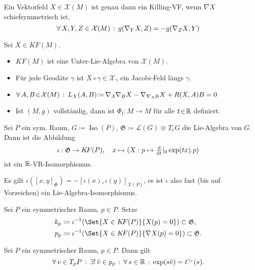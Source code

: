 \documentclass{cheat-sheet}
\DeclareMathOperator{\Iso}{Iso} %
\newcommand{\Gie}{\mathfrak{G}} %
\newcommand{\KF}{K\!F} %
\newcommand{\VF}{\mathcal{X}} %
\begin{document}
\begin{lem}
  Ein Vektorfeld $X \in \VF(M)$ ist genau dann ein Killing-VF, wenn $\nabla X$ schiefsymmetrisch ist, \dh{}
  \[ \fa{X, Y, Z \in \VF(M)} g(\nabla_Y X, Z) = - g(\nabla_Z X, Y) \]
\end{lem}

\begin{facts}
  Sei $X \in \KF(M)$.
  \begin{itemize}
    \item $\KF(M)$ ist eine Unter-Lie-Algebra von $\VF(M)$.
    \item Für jede Geodäte $\gamma$ ist $X \circ \gamma \in \VF_\gamma$ ein Jacobi-Feld längs $\gamma$.
    \item $\fa{A, B \!\in\! \VF(M)} L_X(A, B) \!\coloneqq\! \nabla_A \nabla_B X - \nabla_{\nabla_A B} X + R(X, A)B = 0$
    \item Ist $(M, g)$ vollständig, dann ist $\Phi_t : M \!\to\! M$ für alle $t \!\in\! \mathbb{R}$ definiert.
  \end{itemize}
\end{facts}


\begin{satz}
  Sei $P$ ein sym. Raum, $G \coloneqq \Iso(P)$, $\Gie \coloneqq \mathcal{L}(G) \cong T_e G$ die Lie-Algebra von $G$. Dann ist die Abbildung
  \[
    \iota : \Gie \to \KF(P), \quad
    x \mapsto (X : p \mapsto \tfrac{\d}{\d t}|_0 \exp(tx).p)
  \]
  ist ein $\mathbb{R}$-VR-Isomorphismus.
\end{satz}

\begin{acht}
  Es gilt $\iota([x, y]_\Gie) = - [\iota(x), \iota(y)]_{\VF(P)}$, es ist $\iota$ also fast (bis auf Vorzeichen) ein Lie-Algebra-Isomorphismus.
\end{acht}

\begin{defn}
  Sei $P$ ein symmetrischer Raum, $p \in P$. Setze
  \begin{align*}
    k_p & \coloneqq \iota^{-1}(\Set{X \in \KF(P)}{X(p) = 0}) \subset \Gie, \\
    p_p & \coloneqq \iota^{-1}(\Set{X \in \KF(P)}{\nabla X(p) = 0}) \subset \Gie.
  \end{align*}
\end{defn}

\begin{lem}
  Sei $P$ ein symmetrischer Raum, $p \in P$. Dann gilt
  \[ \forall \, {v \in T_p P} \,:\, \exists! \, {\tilde{v} \in p_p} \,:\, \forall \, {s \in \mathbb{R}} \,:\, \exp(s \tilde{v}) = t^{\gamma_v}(s). \]
\end{lem}
\end{document}

